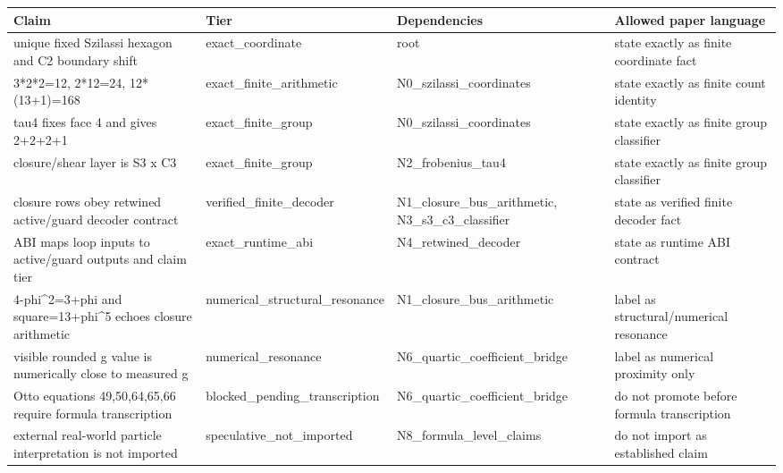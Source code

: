 \begin{center}\small
\begin{tabular}{p{}p{}p{}p{}}
\toprule
Claim & Tier & Dependencies & Allowed paper language\\
\midrule
unique fixed Szilassi hexagon and C2 boundary shift & exact\_coordinate & root & state exactly as finite coordinate fact\\
3*2*2=12, 2*12=24, 12*(13+1)=168 & exact\_finite\_arithmetic & N0\_szilassi\_coordinates & state exactly as finite count identity\\
tau4 fixes face 4 and gives 2+2+2+1 & exact\_finite\_group & N0\_szilassi\_coordinates & state exactly as finite group classifier\\
closure/shear layer is S3 x C3 & exact\_finite\_group & N2\_frobenius\_tau4 & state exactly as finite group classifier\\
closure rows obey retwined active/guard decoder contract & verified\_finite\_decoder & N1\_closure\_bus\_arithmetic, N3\_s3\_c3\_classifier & state as verified finite decoder fact\\
ABI maps loop inputs to active/guard outputs and claim tier & exact\_runtime\_abi & N4\_retwined\_decoder & state as runtime ABI contract\\
4-phi^2=3+phi and square=13+phi^5 echoes closure arithmetic & numerical\_structural\_resonance & N1\_closure\_bus\_arithmetic & label as structural/numerical resonance\\
visible rounded g value is numerically close to measured g & numerical\_resonance & N6\_quartic\_coefficient\_bridge & label as numerical proximity only\\
Otto equations 49,50,64,65,66 require formula transcription & blocked\_pending\_transcription & N6\_quartic\_coefficient\_bridge & do not promote before formula transcription\\
external real-world particle interpretation is not imported & speculative\_not\_imported & N8\_formula\_level\_claims & do not import as established claim\\
\bottomrule
\end{tabular}
\end{center}
